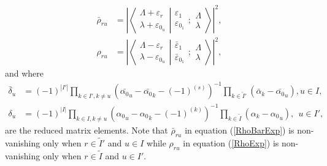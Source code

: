 \documentclass[12pt]{article}
\def\nn{\nonumber}
\begin{document}
\begin{align}
\bar{\rho}_{ru}  &= \left| \left\langle\left. 
\begin{array}{c} \Lambda+\varepsilon_r\\ \lambda+\varepsilon_{0_u} \end{array}
\right|\right.
\left.
\begin{array}{c} \varepsilon_1 \\
\varepsilon_{0_1} \end{array} 
;
 \begin{array}{c} \Lambda \\
\lambda \end{array}
\right\rangle \right|^2, \\
\rho_{ru} &= \left| \left\langle\left. 
\begin{array}{c} \Lambda-\varepsilon_r\\ \lambda-\varepsilon_{0_u} \end{array}
\right|\right.
\left.
\begin{array}{c} \bar{\varepsilon}_1 \\
\bar{\varepsilon}_{0_1}  \end{array}  ; \begin{array}{c} \Lambda \\
\lambda \end{array}
\right\rangle \nn \right|^2,
\end{align}
and where
\begin{align}
\bar{\delta}_u &= (-1)^{|I'|} \prod_{k\in I',k\neq u}\left(\bar{\alpha_0}_u - \bar{\alpha_0}_k -
(-1)^{(s)}\right)^{-1} \prod_{k\in \tilde{I}'}\left(\bar{\alpha}_k - \bar{\alpha_0}_u \right), u\in I, \\
\delta_u &= (-1)^{|I|} \prod_{k\in I,k\neq u} \left({\alpha_0}_u - {\alpha_0}_k -
(-1)^{(k)}\right)^{-1}\prod_{k\in\tilde{I}} \left(\alpha_k - {\alpha_0}_u \right),\ \ u\in I',
\end{align}
are the reduced matrix elements.
Note that $\bar{\rho}_{ru}$ in equation (\ref{RhoBarExp}) is non-vanishing only when $r\in \tilde{I}'$ and $u\in I$ while ${\rho}_{ru}$ in equation (\ref{RhoExp}) is non-vanishing only when $r\in \tilde{I}$ and $u\in I'$.
\end{document}
